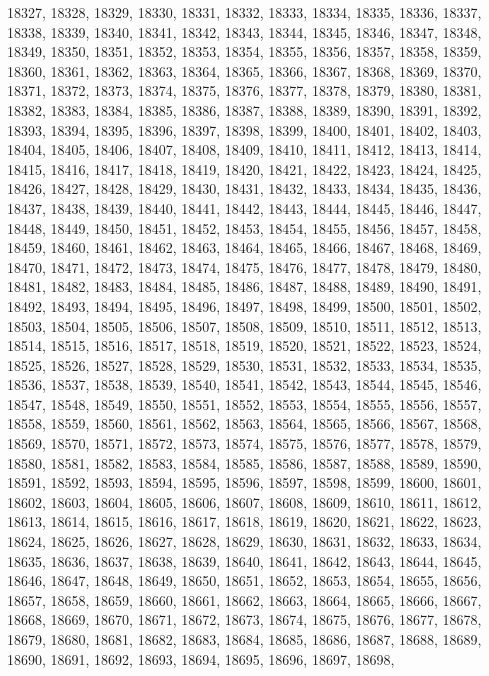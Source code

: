 18327,
18328,
18329,
18330,
18331,
18332,
18333,
18334,
18335,
18336,
18337,
18338,
18339,
18340,
18341,
18342,
18343,
18344,
18345,
18346,
18347,
18348,
18349,
18350,
18351,
18352,
18353,
18354,
18355,
18356,
18357,
18358,
18359,
18360,
18361,
18362,
18363,
18364,
18365,
18366,
18367,
18368,
18369,
18370,
18371,
18372,
18373,
18374,
18375,
18376,
18377,
18378,
18379,
18380,
18381,
18382,
18383,
18384,
18385,
18386,
18387,
18388,
18389,
18390,
18391,
18392,
18393,
18394,
18395,
18396,
18397,
18398,
18399,
18400,
18401,
18402,
18403,
18404,
18405,
18406,
18407,
18408,
18409,
18410,
18411,
18412,
18413,
18414,
18415,
18416,
18417,
18418,
18419,
18420,
18421,
18422,
18423,
18424,
18425,
18426,
18427,
18428,
18429,
18430,
18431,
18432,
18433,
18434,
18435,
18436,
18437,
18438,
18439,
18440,
18441,
18442,
18443,
18444,
18445,
18446,
18447,
18448,
18449,
18450,
18451,
18452,
18453,
18454,
18455,
18456,
18457,
18458,
18459,
18460,
18461,
18462,
18463,
18464,
18465,
18466,
18467,
18468,
18469,
18470,
18471,
18472,
18473,
18474,
18475,
18476,
18477,
18478,
18479,
18480,
18481,
18482,
18483,
18484,
18485,
18486,
18487,
18488,
18489,
18490,
18491,
18492,
18493,
18494,
18495,
18496,
18497,
18498,
18499,
18500,
18501,
18502,
18503,
18504,
18505,
18506,
18507,
18508,
18509,
18510,
18511,
18512,
18513,
18514,
18515,
18516,
18517,
18518,
18519,
18520,
18521,
18522,
18523,
18524,
18525,
18526,
18527,
18528,
18529,
18530,
18531,
18532,
18533,
18534,
18535,
18536,
18537,
18538,
18539,
18540,
18541,
18542,
18543,
18544,
18545,
18546,
18547,
18548,
18549,
18550,
18551,
18552,
18553,
18554,
18555,
18556,
18557,
18558,
18559,
18560,
18561,
18562,
18563,
18564,
18565,
18566,
18567,
18568,
18569,
18570,
18571,
18572,
18573,
18574,
18575,
18576,
18577,
18578,
18579,
18580,
18581,
18582,
18583,
18584,
18585,
18586,
18587,
18588,
18589,
18590,
18591,
18592,
18593,
18594,
18595,
18596,
18597,
18598,
18599,
18600,
18601,
18602,
18603,
18604,
18605,
18606,
18607,
18608,
18609,
18610,
18611,
18612,
18613,
18614,
18615,
18616,
18617,
18618,
18619,
18620,
18621,
18622,
18623,
18624,
18625,
18626,
18627,
18628,
18629,
18630,
18631,
18632,
18633,
18634,
18635,
18636,
18637,
18638,
18639,
18640,
18641,
18642,
18643,
18644,
18645,
18646,
18647,
18648,
18649,
18650,
18651,
18652,
18653,
18654,
18655,
18656,
18657,
18658,
18659,
18660,
18661,
18662,
18663,
18664,
18665,
18666,
18667,
18668,
18669,
18670,
18671,
18672,
18673,
18674,
18675,
18676,
18677,
18678,
18679,
18680,
18681,
18682,
18683,
18684,
18685,
18686,
18687,
18688,
18689,
18690,
18691,
18692,
18693,
18694,
18695,
18696,
18697,
18698,
